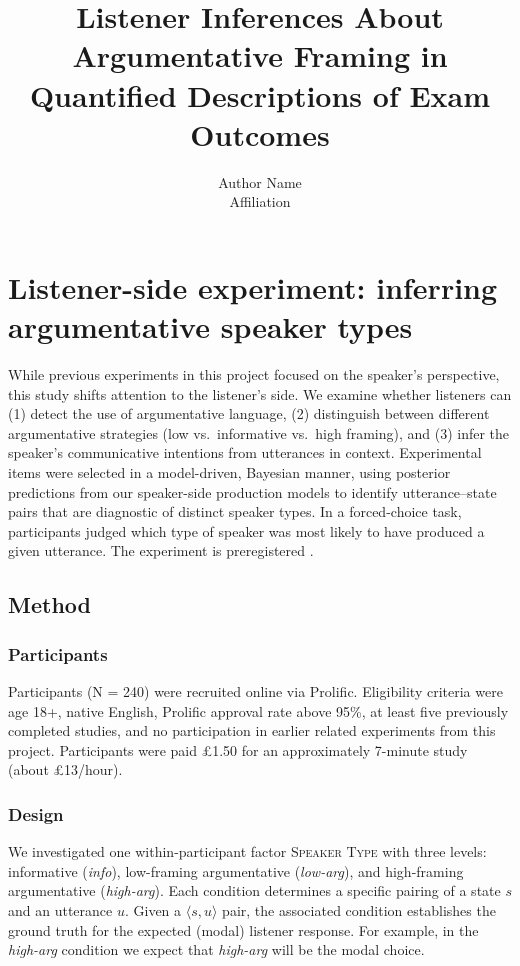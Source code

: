 \documentclass[11pt]{article}
\title{Listener Inferences About Argumentative Framing in Quantified Descriptions of Exam Outcomes}
\author{Author Name\\Affiliation}
\date{}
\begin{document}
\section{Listener-side experiment: inferring argumentative speaker types}
\label{sec:listener-side}

While previous experiments in this project focused on the speaker's perspective, this study shifts attention to the listener's side. 
We examine whether listeners can (1) detect the use of argumentative language, (2) distinguish between different argumentative strategies (low vs.\ informative vs.\ high framing), and (3) infer the speaker's communicative intentions from utterances in context. 
Experimental items were selected in a model-driven, Bayesian manner, using posterior predictions from our speaker-side production models to identify utterance--state pairs that are diagnostic of distinct speaker types. 
In a forced-choice task, participants judged which type of speaker was most likely to have produced a given utterance.
The experiment is preregistered .

\subsection{Method}
\subsubsection{Participants}
Participants (N = 240) were recruited online via Prolific.
Eligibility criteria were age 18+, native English, Prolific approval rate above 95\%, at least five previously completed studies, and no participation in earlier related experiments from this project.
Participants were paid \pounds 1.50 for an approximately 7-minute study (about \pounds 13/hour).

\subsubsection{Design}
We investigated one within-participant factor \textsc{Speaker Type} with three levels: informative (\emph{info}), low-framing argumentative (\emph{low-arg}), and high-framing argumentative (\emph{high-arg}).
Each condition determines a specific pairing of a state $s$ and an utterance $u$.
Given a $\langle s,u \rangle$ pair, the associated condition establishes the ground truth for the expected (modal) listener response.
For example, in the \emph{high-arg} condition we expect that \emph{high-arg} will be the modal choice.
\end{document}
